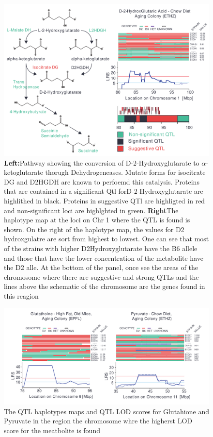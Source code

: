 \documentclass[a4paper]{book}
\begin{document}
	\begin{figure}
		\includegraphics[width=\linewidth]{QTL_Results/D2HG_QTL.pdf}
		\caption{\textbf{Left:}Pathway showing the conversion of D-2-Hydroxyglutarate to $\alpha$-ketoglutarate thorugh Dehydrogeneases. Mutate forms for isocitrate DG and D2HGDH are known to perfoemd this catalysis. Proteins that are contained in a significant Qtl forD-2-Hydroxyglutarate are highlithed in black. Proteins in suggestive QTl are highligted in red and non-significant loci are highlghted in green. \textbf{Right}The haplotype map at the loci on Chr 1 where the QTL is found is shown. On the right of the haplotype map, the values for D2 hydroxgulatre are sort from highest to lowest. One can see that most of the strains with higher D2Hydroxyglutarate have the B6 allele and those that have the lower concentration of the metabolite have the D2 alle. At the bottom of the panel, once see the areas of the chromosome where there are suggestive and strong QTLs and the lines above the schematic of the chromosome are the genes found in this reagion}
	\end{figure}
	
	
	\begin{figure}[ht!]
		\centering
		\includegraphics[width=\linewidth]{3.Metabolomics/QTL_Results}
		\caption{ The QTL haplotypes maps and QTL LOD scores for Glutahione and Pyruvate in the region the chromosome whre the higherst LOD score for the meatbolite is found}
		\label{fig:qtlresults}
	\end{figure}
	
\end{document}
